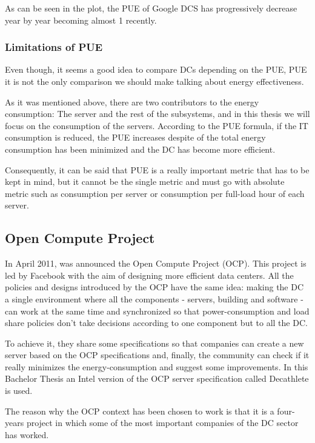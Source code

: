 As can be seen in the plot, the PUE of Google DCS has progressively decrease year by year becoming almost 1 recently.

\subsubsection{Limitations of PUE \cite{ignacioPaper}} 

Even though, it seems a good idea to compare DCs depending on the PUE, PUE it is not the only comparison we should make talking about energy effectiveness.

As it was mentioned above, there are two contributors to the energy consumption: The server and the rest of the subsystems, and in this thesis we will focus on the consumption of the servers. According to the PUE formula, if the IT consumption is reduced, the PUE increases despite of the total energy consumption has been minimized and the DC has become more efficient.

Consequently, it can be said that PUE is a really important metric that has to be kept in mind, but it cannot be the single metric and must go with absolute metric such as consumption per server or consumption per full-load hour of each server. \cite{amer2013pue}

\subsection{Open Compute Project}

In April 2011, was announced the Open Compute Project (OCP). This project is led by Facebook with the aim of designing more efficient data centers. All the policies and designs introduced by the OCP have the same idea: making the DC a single environment where all the components - servers, building and software - can work at the same time and synchronized so that power-consumption and load share policies don't take decisions according to one component but to all the DC.

To achieve it, they share some specifications so that companies can create a new server based on the OCP specifications and, finally, the community can check if it really minimizes the energy-consumption and suggest some improvements. In this Bachelor Thesis an Intel version of the OCP server specification called Decathlete is used.

The reason why the OCP context has been chosen to work is that it is a four-years project in which some of the most important companies of the DC sector has worked. 

